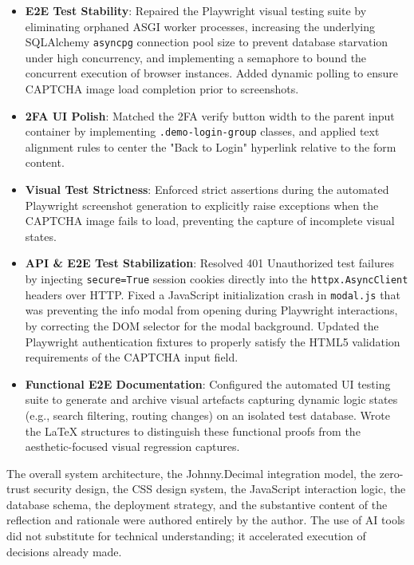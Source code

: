 \documentclass[11pt,a4paper]{book}
\begin{document}
\begin{itemize}
  \item \textbf{E2E Test Stability}: Repaired the Playwright visual testing suite by eliminating orphaned ASGI worker processes, increasing the underlying SQLAlchemy \texttt{asyncpg} connection pool size to prevent database starvation under high concurrency, and implementing a semaphore to bound the concurrent execution of browser instances. Added dynamic polling to ensure CAPTCHA image load completion prior to screenshots.
  \item \textbf{2FA UI Polish}: Matched the 2FA verify button width to the parent input container by implementing \texttt{.demo-login-group} classes, and applied text alignment rules to center the "Back to Login" hyperlink relative to the form content.
  \item \textbf{Visual Test Strictness}: Enforced strict assertions during the automated Playwright screenshot generation to explicitly raise exceptions when the CAPTCHA image fails to load, preventing the capture of incomplete visual states.
  \item \textbf{API \& E2E Test Stabilization}: Resolved 401 Unauthorized test failures by injecting \texttt{secure=True} session cookies directly into the \texttt{httpx.AsyncClient} headers over HTTP. Fixed a JavaScript initialization crash in \texttt{modal.js} that was preventing the info modal from opening during Playwright interactions, by correcting the DOM selector for the modal background. Updated the Playwright authentication fixtures to properly satisfy the HTML5 validation requirements of the CAPTCHA input field.
  \item \textbf{Functional E2E Documentation}: Configured the automated UI testing suite to generate and archive visual artefacts capturing dynamic logic states (e.g., search filtering, routing changes) on an isolated test database. Wrote the LaTeX structures to distinguish these functional proofs from the aesthetic-focused visual regression captures.
\end{itemize}

The overall system architecture, the Johnny.Decimal integration model, the zero-trust security design, the CSS design system, the JavaScript interaction logic, the database schema, the deployment strategy, and the substantive content of the reflection and rationale were authored entirely by the author. The use of AI tools did not substitute for technical understanding; it accelerated execution of decisions already made.

\newpage
\end{document}
